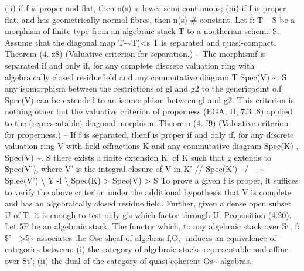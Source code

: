\documentclass[11pt]{article}
\theoremstyle{plain}
\theoremstyle{definition}
\theoremstyle{remark}
\begin{document}
(ii) if f is proper and flat, then n(s) is lower-semi-continuous; (iii) if f is proper flat, and has geometrically normal fibres, then n(s) \# constant. Let f: T-+S be a morphism of finite type from an algebraic stack T to a noetherian scheme S. Assume that the diagonal map T-\textasciitilde{}T)<s T is separated and quasi-compact. Theorem (4. z8) (Valuative criterion for separation.) -- The morphismf is separated if and only if, for any complete discrete valuation ring with algebraically closed residuefield and any commutative diagram T Spec(V) \textasciitilde{}. S any isomorphism between the restrictions of gl and g2 to the genericpoint o.f Spec(V) can be extended to an isomorphism between gl and g2. This criterion is nothing other but the valuative criterion of properness (EGA, II, 7.3 .8) applied to the (representable) diagonal morphism. Theorem (4. I9) (Valuative criterion for properness.) -- If f is separated, thenf is proper if and only if, for any discrete valuation ring V with field offractions K and any commutative diagram Spec(K) , Spec(V) \textasciitilde{}. S there exists a finite extension K' of K such that g extends to Spec(V'), where V' is the integral closure of V in K' // Spec(K') --/----\textasciitilde{} Sp.ee(V') \textbackslash{} Y -l \textbackslash{} Spec(K) > Spec(V) > S To prove a given f is proper, it suffices to verify the above criterion under the additional hypothesis that V is complete and has an algebraically closed residue field. Further, given a dense open subset U of T, it is enough to test only g's which factor through U. Proposition (4.20). -- Let 5P be an algebraic stack. The functor which, to any algebraic stack over St, f: \$'--->5\textasciitilde{} associates the Ose sheaf of algebras f,O,- induces an equivalence of categories between: (i) the category of algebraic stacks representable and affine over St'; (ii) the dual of the category of quasi-coherent Os\textasciitilde{}-algebras.
\end{document}
